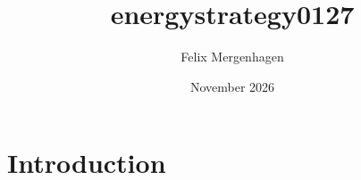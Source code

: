 \documentclass{article}
\title{energystrategy0127}
\author{Felix Mergenhagen}
\date{November 2026}
\begin{document}
\maketitle

\section{Introduction}
\end{document}
